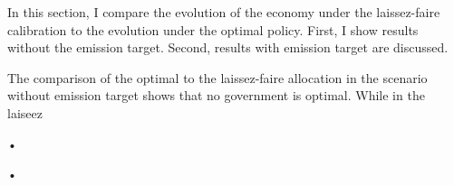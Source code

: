 In this section, I compare the evolution of the economy under the laissez-faire calibration to the evolution under the optimal policy. First, I show results without the emission target. Second, results with emission target are discussed.

The comparison of the optimal to the laissez-faire allocation in the scenario without emission target shows that no government is optimal. While in the laiseez
\begin{minipage}{}
•
\end{minipage}•